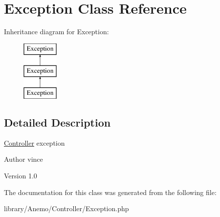 \hypertarget{class_anemo_1_1_controller_1_1_exception}{
\section{Exception Class Reference}
\label{class_anemo_1_1_controller_1_1_exception}
}
Inheritance diagram for Exception:\begin{figure}[H]
\begin{center}
\leavevmode
\includegraphics[height=3.000000cm]{class_anemo_1_1_controller_1_1_exception}
\end{center}
\end{figure}


\subsection{Detailed Description}
\hyperlink{class_anemo_1_1_controller}{Controller} exception \begin{DoxyAuthor}{Author}
vince 
\end{DoxyAuthor}
\begin{DoxyVersion}{Version}
1.0 
\end{DoxyVersion}


The documentation for this class was generated from the following file:\begin{DoxyCompactItemize}
\item 
library/Anemo/Controller/Exception.php\end{DoxyCompactItemize}
